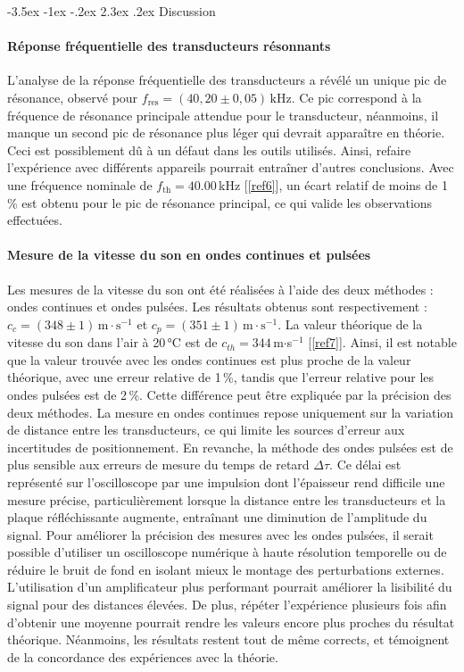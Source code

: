 \documentclass[a4paper, 12pt,oneside]{article}
\makeatletter
\renewcommand{\section}{\@startsection {section}{1}{\z@}%
             {-3.5ex \@plus -1ex \@minus -.2ex}%
             {2.3ex \@plus.2ex}%
             {\normalfont\normalsize\bfseries}}
\makeatother
\begin{document}
\section{Discussion}

\paragraph{Réponse fréquentielle des transducteurs résonnants}

L’analyse de la réponse fréquentielle des transducteurs a révélé un unique pic de résonance, observé pour $f_{\text{res}} = (40,20 \pm 0,05) \, \text{kHz}$. Ce pic correspond à la fréquence de résonance principale attendue pour le transducteur, néanmoins, il manque un second pic de résonance plus léger qui devrait apparaître en théorie. Ceci est possiblement dû à un défaut dans les outils utilisés. Ainsi, refaire l'expérience avec différents appareils pourrait entraîner d'autres conclusions. Avec une fréquence nominale de $f_{\text{th}}=40.00$\,kHz [\ref{ref6}], un écart relatif de moins de 1\,\% est obtenu  pour le pic de résonance principal, ce qui valide les observations effectuées.

\paragraph{Mesure de la vitesse du son en ondes continues et pulsées}

Les mesures de la vitesse du son ont été réalisées à l’aide des deux méthodes : ondes continues et ondes pulsées. Les résultats obtenus sont respectivement : $ c_c = (348 \pm 1) \, \text{m} \cdot \text{s}^{-1}$ et $ c_p = (351 \pm 1) \, \text{m} \cdot \text{s}^{-1}$. La valeur théorique de la vitesse du son dans l’air à 20\,°C est de $c_{th}=344$\,m$\cdot$s$^{-1}$ [\ref{ref7}]. Ainsi, il est notable que la valeur trouvée avec les ondes continues est plus proche de la valeur théorique, avec une erreur relative de 1\,\%, tandis que l’erreur relative pour les ondes pulsées est de 2\,\%. 
Cette différence peut être expliquée par la précision des deux méthodes. La mesure en ondes continues repose uniquement sur la variation de distance entre les transducteurs, ce qui limite les sources d’erreur aux incertitudes de positionnement. En revanche, la méthode des ondes pulsées est de plus sensible aux erreurs de mesure du temps de retard $\Delta \tau$. Ce délai est représenté sur l’oscilloscope par une impulsion dont l’épaisseur rend difficile une mesure précise, particulièrement lorsque la distance entre les transducteurs et la plaque réfléchissante augmente, entraînant une diminution de l’amplitude du signal. Pour améliorer la précision des mesures avec les ondes pulsées, il serait possible d’utiliser un oscilloscope numérique à haute résolution temporelle ou de réduire le bruit de fond en isolant mieux le montage des perturbations externes. L’utilisation d’un amplificateur plus performant pourrait améliorer la lisibilité du signal pour des distances élevées. De plus, répéter l'expérience plusieurs fois afin d'obtenir une moyenne pourrait rendre les valeurs encore plus proches du résultat théorique. Néanmoins, les résultats restent tout de même corrects, et témoignent de la concordance des expériences avec la théorie.  
\end{document}
